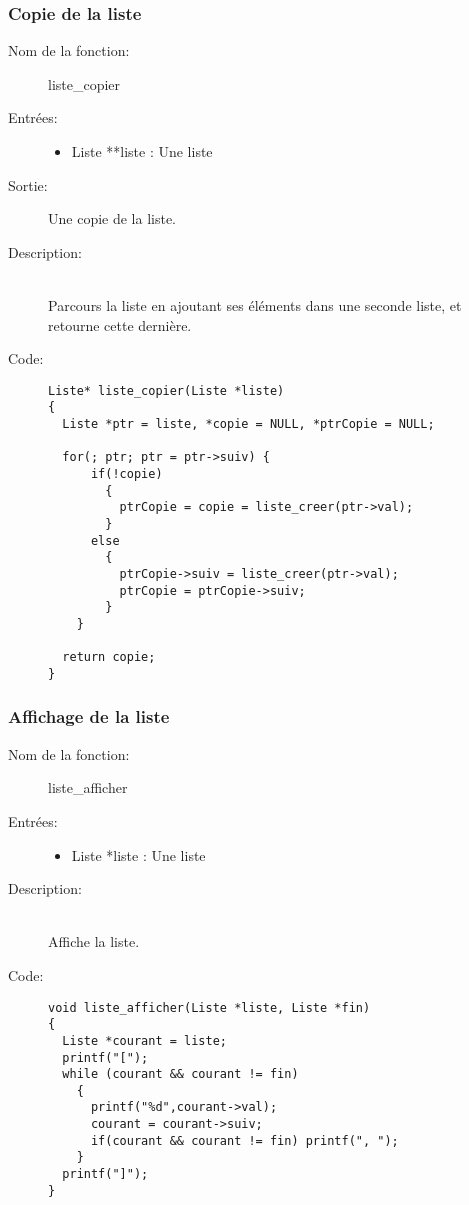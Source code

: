 \documentclass[a4paper]{article}
\begin{document}
\subsubsection{Copie de la liste}
\begin{description}
  \item[Nom de la fonction:] liste\_copier

  \item[Entrées:] \hfill
    \begin{itemize}
      \item Liste **liste : Une liste
    \end{itemize}

  \item[Sortie:] \hfill
    Une copie de la liste.

  \item[Description:] \hfill \\ 
    Parcours la liste en ajoutant ses éléments dans une seconde liste, et 
    retourne cette dernière.
    
  \item[Code:] \hfill
  \begin{lstlisting}
Liste* liste_copier(Liste *liste)
{
  Liste *ptr = liste, *copie = NULL, *ptrCopie = NULL;

  for(; ptr; ptr = ptr->suiv) {
      if(!copie)
        {
          ptrCopie = copie = liste_creer(ptr->val);
        }
      else
        {
          ptrCopie->suiv = liste_creer(ptr->val);
          ptrCopie = ptrCopie->suiv;
        }
    }

  return copie;
}
  \end{lstlisting}
\end{description}

\subsubsection{Affichage de la liste}
\begin{description}
  \item[Nom de la fonction:] liste\_afficher

  \item[Entrées:] \hfill
    \begin{itemize}
      \item Liste *liste : Une liste
    \end{itemize}

  \item[Description:] \hfill \\ 
    Affiche la liste.

  \item[Code:] \hfill 
  \begin{lstlisting}
void liste_afficher(Liste *liste, Liste *fin)
{
  Liste *courant = liste;
  printf("[");
  while (courant && courant != fin)
    {
      printf("%d",courant->val);
      courant = courant->suiv;
      if(courant && courant != fin) printf(", ");
    }
  printf("]");
}
  \end{lstlisting}

\end{description}
\end{document}
